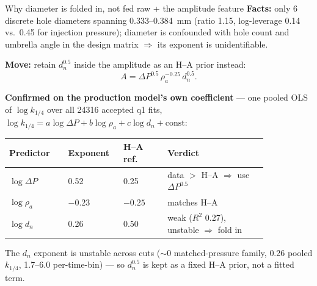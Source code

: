 \documentclass[aspectratio=169,11pt]{beamer}
\newcommand{\good}[1]{\textcolor{goodGreen}{#1}}
\newcommand{\warn}[1]{\textcolor{warnRed}{#1}}
\begin{document}
\begin{frame}{Why diameter is folded in, not fed raw + the amplitude feature}
\small
\textbf{Facts:} only 6 discrete hole diameters spanning \num{0.333}--\SI{0.384}{mm} (ratio 1.15, log-leverage 0.14 vs.\ 0.45 for injection pressure); diameter is confounded with hole count and umbrella angle in the design matrix $\Rightarrow$ its exponent is unidentifiable.

\textbf{Move:} retain $d_n^{0.5}$ inside the amplitude as an H--A prior instead:
\[
A=\Delta P^{0.5}\,\rho_a^{-0.25}\,d_n^{0.5}.
\]

\vspace{0.3em}
\footnotesize
\textbf{Confirmed on the production model's own coefficient} --- one pooled OLS of $\log k_{1/4}$ over all \num{24316} accepted q1 fits, $\log k_{1/4}=a\log\Delta P+b\log\rho_a+c\log d_n+\text{const}$:
\renewcommand{\arraystretch}{1.05}
\begin{center}
\begin{tabular}{C{0.20\linewidth}C{0.15\linewidth}C{0.15\linewidth}C{0.34\linewidth}}
\toprule
Predictor & Exponent & H--A ref. & Verdict \\
\midrule
$\log\Delta P$ & \good{0.52} & 0.25 & data $>$ H--A $\Rightarrow$ use $\Delta P^{0.5}$ \\
$\log\rho_a$   & \good{$-0.23$} & $-0.25$ & matches H--A \\
$\log d_n$     & \warn{0.26} & 0.50 & weak ($R^2$ 0.27), unstable $\Rightarrow$ fold in \\
\bottomrule
\end{tabular}
\end{center}
\smallskip
The $d_n$ exponent is unstable across cuts (\warn{$\sim$0} matched-pressure family, \warn{0.26} pooled $k_{1/4}$, \warn{1.7--6.0} per-time-bin) --- so $d_n^{0.5}$ is kept as a fixed H--A prior, not a fitted term.
\end{frame}
\end{document}

